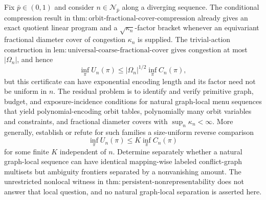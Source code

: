 Fix \(\bar p\in(0,1)\) and consider \(n\in\mathcal N_{\bar p}\) along a diverging sequence. The conditional compression result in \(\mathrm{thm{:}orbit\text{-}fractional\text{-}cover\text{-}compression}\) already gives an exact quotient linear program and a \(\sqrt{\kappa_n}\)-factor bracket whenever an equivariant fractional diameter cover of congestion \(\kappa_n\) is supplied. The trivial-action construction in \(\mathrm{lem{:}universal\text{-}coarse\text{-}fractional\text{-}cover}\) gives congestion at most \(|\Omega_n|\), and hence
\[
 \inf_\pi U_n(\pi)
 \le |\Omega_n|^{1/2}\inf_\pi C_n(\pi),
\]
but this certificate can have exponential encoding length and its factor need not be uniform in \(n\). The residual problem is to identify and verify primitive graph, budget, and exposure-incidence conditions for natural graph-local menu sequences that yield polynomial-encoding orbit tables, polynomially many orbit variables and constraints, and fractional diameter covers with \(\sup_n\kappa_n<\infty\). More generally, establish or refute for such families a size-uniform reverse comparison
\[
 \inf_\pi U_n(\pi)\le K\inf_\pi C_n(\pi)
\]
for some finite \(K\) independent of \(n\). Determine separately whether a natural graph-local sequence can have identical mapping-wise labeled conflict-graph multisets but ambiguity frontiers separated by a nonvanishing amount. The unrestricted nonlocal witness in \(\mathrm{thm{:}persistent\text{-}nonrepresentability}\) does not answer that local question, and no natural graph-local separation is asserted here.
